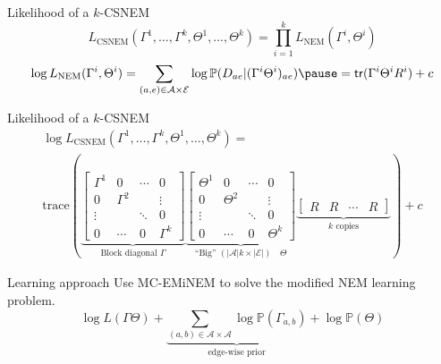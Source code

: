 \documentclass[aspectratio=169]{beamer}
\begin{document}

\begin{frame}{Likelihood of a $k$-CSNEM}
\[
L_\text{CSNEM}( \Gamma^1, \ldots, \Gamma^k, \Theta^1, \ldots, \Theta^k )
 = \prod_{i=1}^k L_\text{NEM}( \Gamma^i, \Theta^i ) \]
\pause
\[
\log L_\text{NEM}(\Gamma^i, \Theta^i) = \sum_{(a,e) \in \mathcal A \times \mathcal E} \log \mathbb P ( D_{ae} | (\Gamma^i \Theta^i)_{ae} ) \pause = \mathsf{tr} ( \Gamma^i \Theta^i R^i ) + c
\]
\end{frame}


\begin{frame}{Likelihood of a $k$-CSNEM}
\begin{multline*}
\log L_\text{CSNEM}( \Gamma^1, \ldots, \Gamma^k, \Theta^1, \ldots, \Theta^k )
 = \\ \text{trace}\left(
 \underbrace{\begin{bmatrix}
	\Gamma^1 & 0 & \cdots & 0 \\
	0 & \Gamma^2 & & \vdots \\
	\vdots & & \ddots & 0 \\
	0 & \cdots & 0 & \Gamma^k
 \end{bmatrix}}_{\text{Block diagonal } \Gamma}
 \underbrace{\begin{bmatrix}
	\Theta^1 & 0 & \cdots & 0 \\
	0 & \Theta^2 & & \vdots \\
	\vdots & & \ddots & 0 \\
	0 & \cdots & 0 & \Theta^k
 \end{bmatrix}}_{\text{``Big'' } (|\mathcal A|k \times |\mathcal E|)\quad \Theta}
 \underbrace{\begin{bmatrix}
	R & R & \cdots & R
 \end{bmatrix}}_{k \text{ copies}} \right) + c
\end{multline*}
\end{frame}

\begin{frame}{Learning approach}
Use MC-EMiNEM \parencite{niederberger2012mc} to solve the modified NEM learning problem.
\[
\log L( \Gamma \Theta ) + \underbrace{\sum_{(a,b) \in \mathcal A \times \mathcal A} \log \mathbb P(\Gamma_{a,b})}_{\text{edge-wise prior}} + \log \mathbb P( \Theta )
\]
\end{frame}


\end{document}
